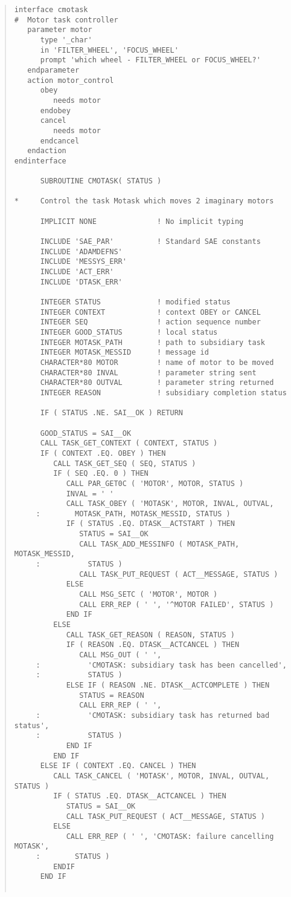 \documentclass[twoside,11pt]{article}
\renewcommand{\_}{\texttt{\symbol{95}}}
\begin{document}
\small \begin{quote} \begin{verbatim}
interface cmotask
#  Motor task controller
   parameter motor
      type '_char'
      in 'FILTER_WHEEL', 'FOCUS_WHEEL'
      prompt 'which wheel - FILTER_WHEEL or FOCUS_WHEEL?'
   endparameter
   action motor_control
      obey
         needs motor
      endobey
      cancel
         needs motor
      endcancel
   endaction
endinterface

      SUBROUTINE CMOTASK( STATUS )

*     Control the task Motask which moves 2 imaginary motors

      IMPLICIT NONE              ! No implicit typing

      INCLUDE 'SAE_PAR'          ! Standard SAE constants
      INCLUDE 'ADAMDEFNS'
      INCLUDE 'MESSYS_ERR'
      INCLUDE 'ACT_ERR'  
      INCLUDE 'DTASK_ERR'

      INTEGER STATUS             ! modified status
      INTEGER CONTEXT            ! context OBEY or CANCEL
      INTEGER SEQ                ! action sequence number
      INTEGER GOOD_STATUS        ! local status
      INTEGER MOTASK_PATH        ! path to subsidiary task
      INTEGER MOTASK_MESSID      ! message id
      CHARACTER*80 MOTOR         ! name of motor to be moved
      CHARACTER*80 INVAL         ! parameter string sent
      CHARACTER*80 OUTVAL        ! parameter string returned
      INTEGER REASON             ! subsidiary completion status

      IF ( STATUS .NE. SAI__OK ) RETURN

      GOOD_STATUS = SAI__OK
      CALL TASK_GET_CONTEXT ( CONTEXT, STATUS )
      IF ( CONTEXT .EQ. OBEY ) THEN
         CALL TASK_GET_SEQ ( SEQ, STATUS )
         IF ( SEQ .EQ. 0 ) THEN
            CALL PAR_GET0C ( 'MOTOR', MOTOR, STATUS )
            INVAL = ' '
            CALL TASK_OBEY ( 'MOTASK', MOTOR, INVAL, OUTVAL,
     :        MOTASK_PATH, MOTASK_MESSID, STATUS )
            IF ( STATUS .EQ. DTASK__ACTSTART ) THEN
               STATUS = SAI__OK
               CALL TASK_ADD_MESSINFO ( MOTASK_PATH, MOTASK_MESSID, 
     :           STATUS )          
               CALL TASK_PUT_REQUEST ( ACT__MESSAGE, STATUS )
            ELSE
               CALL MSG_SETC ( 'MOTOR', MOTOR )
               CALL ERR_REP ( ' ', '^MOTOR FAILED', STATUS )
            END IF
         ELSE 
            CALL TASK_GET_REASON ( REASON, STATUS )
            IF ( REASON .EQ. DTASK__ACTCANCEL ) THEN
               CALL MSG_OUT ( ' ',
     :           'CMOTASK: subsidiary task has been cancelled',
     :           STATUS )
            ELSE IF ( REASON .NE. DTASK__ACTCOMPLETE ) THEN
               STATUS = REASON
               CALL ERR_REP ( ' ',
     :           'CMOTASK: subsidiary task has returned bad status',
     :           STATUS )
            END IF
         END IF
      ELSE IF ( CONTEXT .EQ. CANCEL ) THEN
         CALL TASK_CANCEL ( 'MOTASK', MOTOR, INVAL, OUTVAL, STATUS )
         IF ( STATUS .EQ. DTASK__ACTCANCEL ) THEN
            STATUS = SAI__OK
            CALL TASK_PUT_REQUEST ( ACT__MESSAGE, STATUS )
         ELSE
            CALL ERR_REP ( ' ', 'CMOTASK: failure cancelling MOTASK', 
     :        STATUS )
         ENDIF
      END IF


\end{verbatim}
\end{quote}
\end{document}

